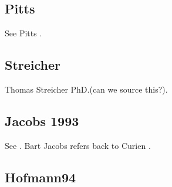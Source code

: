 \documentclass[10pt,a4paper]{article}
\begin{document}
\subsection{Pitts}
See Pitts \cite{pitts2000}.

\subsection{Streicher}
Thomas Streicher PhD.(can we source this?).

\subsection{Jacobs 1993}
See \cite{jacobs93}.
Bart Jacobs refers back to Curien \cite{curien89}.

\subsection {Hofmann94}
\end{document}
